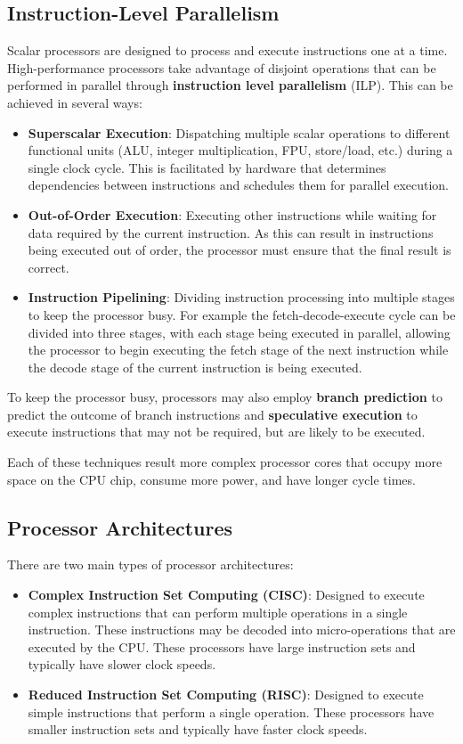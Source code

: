 \documentclass{article}
\begin{document}
\subsection{Instruction-Level Parallelism}
Scalar processors are designed to process and execute instructions one
at a time. High-performance processors take advantage of disjoint
operations that can be performed in parallel through
\textbf{instruction level parallelism} (ILP). This can be achieved in
several ways:
\begin{itemize}
    \item \textbf{Superscalar Execution}: Dispatching multiple
          scalar operations to different functional units (ALU, integer
          multiplication, FPU, store/load, etc.) during a single
          clock cycle. This is facilitated by hardware that determines
          dependencies between instructions and schedules them for
          parallel execution.
    \item \textbf{Out-of-Order Execution}: Executing other instructions
          while waiting for data required by the current instruction.
          As this can result in instructions being executed out of
          order, the processor must ensure that the final result is
          correct.
    \item \textbf{Instruction Pipelining}: Dividing instruction
          processing into multiple stages to keep the processor busy.
          For example the fetch-decode-execute cycle can be divided
          into three stages, with each stage being executed in
          parallel, allowing the processor to begin executing the
          fetch stage of the next instruction while the decode stage
          of the current instruction is being executed.
\end{itemize}
To keep the processor busy, processors may also employ \textbf{branch
    prediction} to predict the outcome of branch instructions and
\textbf{speculative execution} to execute instructions that may not be
required, but are likely to be executed.

Each of these techniques result more complex processor cores that
occupy more space on the CPU chip, consume more power, and have longer
cycle times.
\subsection{Processor Architectures}
There are two main types of processor architectures:
\begin{itemize}
    \item \textbf{Complex Instruction Set Computing (CISC)}: Designed
          to execute complex instructions that can perform multiple
          operations in a single instruction. These instructions may be
          decoded into micro-operations that are executed by the CPU.
          These processors have large instruction sets and typically
          have slower clock speeds.
    \item \textbf{Reduced Instruction Set Computing (RISC)}: Designed
          to execute simple instructions that perform a single
          operation. These processors have smaller instruction sets and
          typically have faster clock speeds.
\end{itemize}
\end{document}
